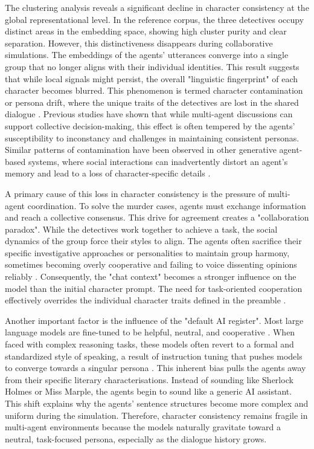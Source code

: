 \documentclass{article}
\begin{document}
The clustering analysis reveals a significant decline in character consistency at the global representational level. In the reference corpus, the three detectives occupy distinct areas in the embedding space, showing high cluster purity and clear separation. However, this distinctiveness disappears during collaborative simulations. The embeddings of the agents' utterances converge into a single group that no longer aligns with their individual identities. This result suggests that while local signals might persist, the overall "linguistic fingerprint" of each character becomes blurred. This phenomenon is termed character contamination or persona drift, where the unique traits of the detectives are lost in the shared dialogue \citep{choi2024examining, bao2026eval4sim}. Previous studies \citep{baltaji2024cultured,choi2024examining} have shown that while multi-agent discussions can support collective decision-making, this effect is often tempered by the agents’ susceptibility to inconstancy and challenges in maintaining consistent personas. Similar patterns of contamination have been observed in other generative agent-based systems, where social interactions can inadvertently distort an agent's memory and lead to a loss of character-specific details \citep{xiao2023simulating}.

A primary cause of this loss in character consistency is the pressure of multi-agent coordination. To solve the murder cases, agents must exchange information and reach a collective consensus. This drive for agreement creates a "collaboration paradox". While the detectives work together to achieve a task, the social dynamics of the group force their styles to align. The agents often sacrifice their specific investigative approaches or personalities to maintain group harmony, sometimes becoming overly cooperative and failing to voice dissenting opinions reliably \citep{baltaji2024cultured, park2023generative}. Consequently, the "chat context" becomes a stronger influence on the model than the initial character prompt. The need for task-oriented cooperation effectively overrides the individual character traits defined in the preamble \citep{shanahan2023role, xiao2023simulating, chen2024socialbench}.

Another important factor is the influence of the "default AI register". Most large language models are fine-tuned to be helpful, neutral, and cooperative \citep{shanahan2023role}. When faced with complex reasoning tasks, these models often revert to a formal and standardized style of speaking, a result of instruction tuning that pushes models to converge towards a singular persona \citep{park2023generative, moon2024anthology}. This inherent bias pulls the agents away from their specific literary characterisations. Instead of sounding like Sherlock Holmes or Miss Marple, the agents begin to sound like a generic AI assistant. This shift explains why the agents' sentence structures become more complex and uniform during the simulation. Therefore, character consistency remains fragile in multi-agent environments because the models naturally gravitate toward a neutral, task-focused persona, especially as the dialogue history grows.
\end{document}
